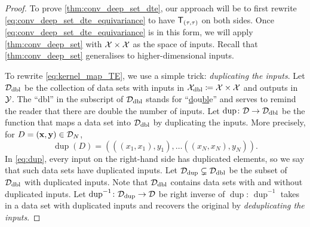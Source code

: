 \documentclass[12pt, twoside]{report}
\begin{document}
\begin{proof}

To prove \cref{thm:conv_deep_set_dte}, our approach will be to first rewrite \eqref{eq:conv_deep_set_dte_equivariance} to have $\T_{(\tau, \tau)}$ on both sides.
Once \eqref{eq:conv_deep_set_dte_equivariance} is in this form, we will apply \cref{thm:conv_deep_set} with $\mathcal{X}\times\mathcal{X}$ as the space of inputs.
Recall that \cref{thm:conv_deep_set} generalises to higher-dimensional inputs.

\newcommand{\dup}{\operatorname{dup}{}\!}%
\newcommand{\dedup}{\operatorname{dup}^{-1}\!{}}%
To rewrite \eqref{eq:kernel_map_TE}, we use a simple trick: \emph{duplicating the inputs}.
Let $\D\ss{dbl}$ be the collection of data sets with inputs in $\X\ss{dbl} \coloneqq \X \times \X$ and outputs in $\mathcal{Y}$.
The ``dbl'' in the subscript of $\D\ss{dbl}$ stands for ``\underline{d}ou\underline{bl}e'' and serves to remind the reader that there are double the number of inputs.
Let $\operatorname{dup}\colon \D \to \D\ss{dbl}$ be the function that maps a data set into $\D\ss{dbl}$ by duplicating the inputs.
More precisely, for $D = (\mathbf{x},\mathbf{y}) \in \mathcal{D}_N$,%
\begin{equation} \label{eq:dup}
    \operatorname{dup}(D) = (
        ((x_1, x_1), y_1),
        \ldots
        ((x_N, x_N), y_N)
    ).
\end{equation}
In \eqref{eq:dup}, every input on the right-hand side has duplicated elements,
so we say that such data sets have duplicated inputs.
Let $\D\ss{dup} \subsetneq \D\ss{dbl}$ be the subset of $\D\ss{dbl}$ with duplicated inputs.
Note that $\D\ss{dbl}$ contains data sets with and without duplicated inputs.
Let $\operatorname{dup}^{-1}\colon \D\ss{dup} \to \D$ be right inverse of $\operatorname{dup}$:
$\operatorname{dup}^{-1}$ takes in a data set with duplicated inputs and recovers the original by \emph{deduplicating the inputs}.


\end{proof}
\end{document}
